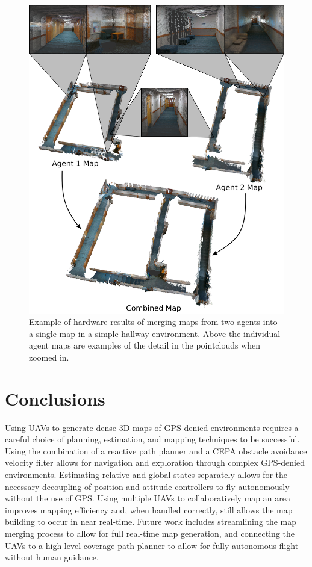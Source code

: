 \documentclass[letterpaper, 10 pt, conference]{ieeeconf}  %
\begin{document}
\begin{figure}
\centering
\includegraphics[width=0.9\linewidth]{wilk3_map.png}
\caption{Example of hardware results of merging maps from two agents into a single map in a simple hallway environment. Above the individual agent maps are examples of the detail in the pointclouds when zoomed in.}
\label{fig:wilk3_map}
\end{figure}
\section{Conclusions}\label{conclusions}

Using UAVs to generate dense 3D maps of GPS-denied environments requires a careful choice of planning, estimation, and mapping techniques to be successful. Using the combination of a reactive path planner and a CEPA obstacle avoidance velocity filter allows for navigation and exploration through complex GPS-denied environments. Estimating relative and global states separately allows for the necessary decoupling of position and attitude controllers to fly autonomously without the use of GPS. Using multiple UAVs to collaboratively map an area improves mapping efficiency and, when handled correctly, still allows the map building to occur in near real-time. Future work includes streamlining the map merging process to allow for full real-time map generation, and connecting the UAVs to a high-level coverage path planner to allow for fully autonomous flight without human guidance.
\end{document}
